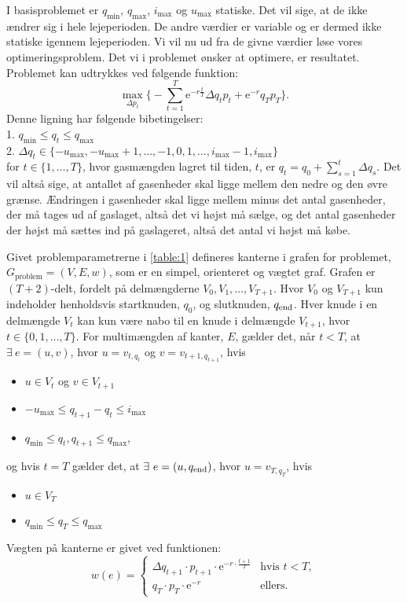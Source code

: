 I basisproblemet er $q_{\min}$, $q_{\max}$, $i_{\max}$ og $u_{\max}$ statiske. Det vil sige, at de ikke ændrer sig i hele lejeperioden. De andre værdier er variable og er dermed ikke statiske igennem lejeperioden. Vi vil nu ud fra de givne værdier løse vores optimeringsproblem. Det vi i problemet ønsker at optimere, er resultatet. Problemet kan udtrykkes ved følgende funktion:
\begin{equation}
\max_{\Delta p_{t}} \Bigg\{ -\sum_{t=1}^{T} \mathrm{e}^{-r\frac{t}{T}} \Delta q_{t} p_{t}+ \mathrm{e}^{-r}q_{T}p_{T} \Bigg\}.
\end{equation}
Denne ligning har følgende bibetingelser:\\
1. $q_{\min} \leq q_{t} \leq q_{\max}$\\
2. $\Delta q_{t} \in \{-u_{\max},-u_{\max}+1,\dotsc,-1,0,1,\dotsc,i_{\max}-1,i_{\max} \}$ \\
for $t \in \{1,\dotsc,T\}$, hvor gasmængden lagret til tiden, $t$, er $q_{t}=q_{0}+\sum_{s=1}^{t} \Delta q_{s}$.
Det vil altså sige, at antallet af gasenheder skal ligge mellem den nedre og den øvre grænse. Ændringen i gasenheder skal ligge mellem minus det antal gasenheder, der må tages ud af gaslaget, altså det vi højst må sælge, og det antal gasenheder der højst må sættes ind på gaslageret, altså det antal vi højst må købe.


\begin{defn}
Givet problemparametrerne i \autoref{table:1} defineres kanterne i grafen for problemet, $G_{\textrm{problem}}=(V,E,w)$, som er en simpel, orienteret og vægtet graf. Grafen er $(T+2)$-delt, fordelt på delmængderne $V_0,V_1, \dotsc, V_{T+1}$. Hvor $V_0$ og $V_{T+1}$ kun indeholder henholdsvis startknuden, $q_0$, og slutknuden, $q_{\textrm{end}}$. Hver knude i en delmængde $V_t$ kan kun være nabo til en knude i delmængde $V_{t+1}$, hvor $t \in \{0,1, \dotsc,T\}$.
For multimængden af kanter, $E$, gælder det, når $t<T$, at $\exists \ e = (u,v)$, hvor $u=v_{t,q_t}$ og $v=v_{t+1, q_{t+1}}$, hvis
	\begin{itemize}
	\item $u \in V_t$ og $v \in V_{t+1}$
	\item $-u_{\max} \leq q_{t+1}-q_t \leq i_{\max}$
	\item $q_{\min} \leq q_t, q_{t+1} \leq q_{\max}$,
	\end{itemize}
og hvis $t=T$ gælder det, at $\exists \ e=(u,q_{\slut})$, hvor $u=v_{T,q_T}$, hvis
	\begin{itemize}
	\item $u \in V_T$
	\item $q_{\min} \leq q_{T} \leq q_{\max}$
	\end{itemize}
Vægten på kanterne er givet ved funktionen:
\begin{equation}
w(e)=
	\begin{cases}
	\Delta q_{t+1} \cdot p_{t+1} \cdot \textrm{e}^{-r \cdot \frac{t+1}{T}} &\text{hvis } t < T, \\
	q_T \cdot p_T \cdot \textrm{e}^{-r} & \text{ellers.}
	\end{cases}
\end{equation}

\end{defn}
